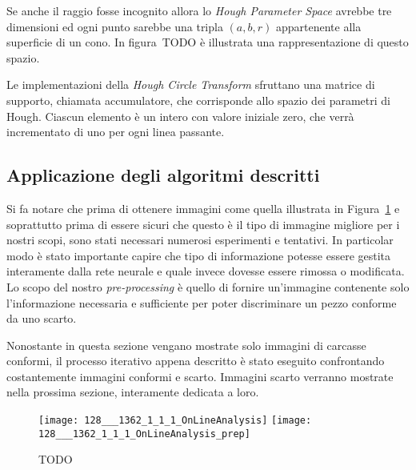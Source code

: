 Se anche il raggio fosse incognito allora lo \textit{Hough Parameter Space} avrebbe tre dimensioni ed ogni punto sarebbe una tripla $(a,b,r)$ appartenente alla superficie di un cono.
In figura~TODO è illustrata una rappresentazione di questo spazio.

Le implementazioni della \textit{Hough Circle Transform} sfruttano una matrice di supporto, chiamata accumulatore, che corrisponde allo spazio dei parametri di Hough.
Ciascun elemento è un intero con valore iniziale zero, che verrà incrementato di uno per ogni linea passante.




\clearpage
\subsection {Applicazione degli algoritmi descritti}
Si fa notare che prima di ottenere immagini come quella illustrata in Figura~\ref{fig:prima_dopo_prep} e soprattutto prima di essere sicuri che questo è il tipo di immagine migliore per i nostri scopi, sono stati necessari numerosi esperimenti e tentativi.
In particolar modo è stato importante capire che tipo di informazione potesse essere gestita interamente dalla rete neurale e quale invece dovesse essere rimossa o modificata.
Lo scopo del nostro \textit{pre-processing} è quello di fornire un'immagine contenente solo l'informazione necessaria e sufficiente per poter discriminare un pezzo conforme da uno scarto.

Nonostante in questa sezione vengano mostrate solo immagini di carcasse conformi, il processo iterativo appena descritto è stato eseguito confrontando costantemente immagini conformi e scarto.
Immagini scarto verranno mostrate nella prossima sezione, interamente dedicata a loro.

\begin{figure}[ht] %
  \begin{center}
    \texttt{[image: 128\_\_\_1362\_1\_1\_1\_OnLineAnalysis]}
    \texttt{[image: 128\_\_\_1362\_1\_1\_1\_OnLineAnalysis\_prep]}
    \caption{TODO }
    \label{fig:prima_dopo_prep}
  \end{center}
\end{figure}

